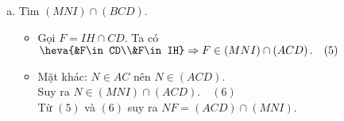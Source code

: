 \begin{bt}
{\begin{enumerate}[a)]
				\begin{itemize}
					\item Gọi $E=IH\cap BD$. Ta có $\heva{&E\in BD\\&E\in IH}\Rightarrow E\in \left(MNI\right)\cap\left(ABD\right).\quad (3)$
					\item Dễ thấy $M\in \left(ABD\right)\cap\left(MNI\right).\quad (4)$
				\end{itemize}
				Từ $(3)$ và $(4)$ suy ra $ME=\left(ABD\right)\cap\left(MNI\right)$.
		\item Tìm $(MNI) \cap (BCD)$.
			\begin{itemize}
				\item Gọi $F=IH\cap CD$. Ta có $\heva{&F\in CD\\&F\in IH}\Rightarrow F\in \left(MNI\right)\cap\left(ACD\right).\quad (5)$
				\item Mặt khác: $N\in AC$ nên $N\in \left(ACD\right)$.\\
				Suy ra $N\in \left(MNI\right)\cap\left(ACD\right).\quad (6)$\\
				Từ $(5)$ và $(6)$ suy ra $NF=\left(ACD\right)\cap\left(MNI\right)$.
			\end{itemize}
	\end{enumerate}
	}
\end{bt}
